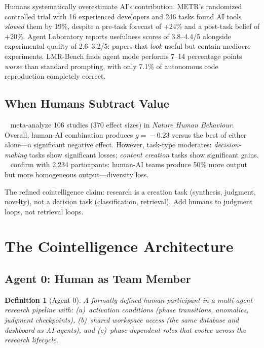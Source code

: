 \documentclass{article}
\newtheorem{definition}{Definition}
\begin{document}
Humans systematically overestimate AI's contribution. METR's
 randomized controlled trial with 16 experienced
developers and 246 tasks found AI tools \emph{slowed} them by 19\%,
despite a pre-task forecast of +24\% and a post-task belief of +20\%.
Agent Laboratory \cite{schmidgall2025agentlab} reports usefulness
scores of 3.8--4.4/5 alongside experimental quality of 2.6--3.2/5:
papers that \emph{look} useful but contain mediocre experiments.
LMR-Bench \cite{yan2025lmrbench} finds agent mode performs 7--14
percentage points \emph{worse} than standard prompting, with only 7.1\%
of autonomous code reproduction completely correct.


\subsection{When Humans Subtract Value}
\label{sec:subtract}

\citeauthor{vaccaro2024combinations}~
meta-analyze 106 studies (370 effect sizes) in \emph{Nature Human
Behaviour}. Overall, human-AI combination produces $g\!=\!{-}0.23$
versus the best of either alone---a significant negative effect.
However, task-type moderates: \emph{decision-making} tasks show
significant losses; \emph{content creation} tasks show significant
gains. \citeauthor{ju2025collaborating}~
confirm with 2,234 participants: human-AI teams produce 50\% more output
but more homogeneous output---diversity loss.

The refined cointelligence claim: research is a creation task (synthesis,
judgment, novelty), not a decision task (classification, retrieval). Add
humans to judgment loops, not retrieval loops.


\section{The Cointelligence Architecture}
\label{sec:architecture}

\subsection{Agent 0: Human as Team Member}
\label{sec:agent0}

\begin{definition}[Agent 0]
A formally defined human participant in a multi-agent research pipeline
with: (a)~activation conditions (phase transitions, anomalies, judgment
checkpoints), (b)~shared workspace access (the same database and
dashboard as AI agents), and (c)~phase-dependent roles that evolve
across the research lifecycle.
\end{definition}
\end{document}
